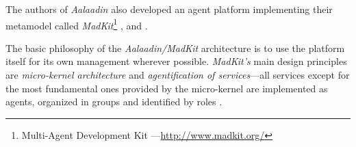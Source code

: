 The authors of \textit{Aalaadin} also developed an agent platform implementing their metamodel called \textit{MadKit}\footnote{Multi-Agent Development Kit ---\url{http://www.madkit.org/}} \cite{Ferber97}, \cite{Ferber98} and \cite{Gutknecht00}.

The basic philosophy of the \textit{Aalaadin/MadKit} architecture is to use the platform itself for its own management wherever possible.
\textit{MadKit's} main design principles are \textit{micro-kernel architecture} and \textit{agentification of services}---all services except for the most fundamental ones provided by the micro-kernel are implemented as agents, organized in groups and identified by roles \cite{Ferber98}.
